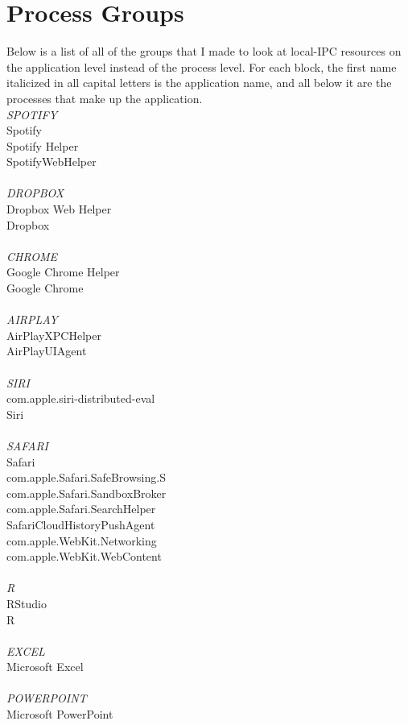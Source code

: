 \chapter{Process Groups}
\label{appendix:processGroups}
Below is a list of all of the groups that I made to look at local-IPC resources on the application level instead of the process level.  For each block, the first name italicized in all capital letters is the application name, and all below it are the processes that make up the application.
\\
\textit{SPOTIFY}\\
Spotify\\
Spotify Helper\\
SpotifyWebHelper\\
\\
\textit{DROPBOX}\\
Dropbox Web Helper\\
Dropbox\\
\\
\textit{CHROME}\\
Google Chrome Helper\\
Google Chrome\\
\\
\textit{AIRPLAY}\\
AirPlayXPCHelper\\
AirPlayUIAgent\\
\\
\textit{SIRI}\\
com.apple.siri-distributed-eval\\
Siri\\
\\
\textit{SAFARI}\\
Safari\\
com.apple.Safari.SafeBrowsing.S\\
com.apple.Safari.SandboxBroker\\
com.apple.Safari.SearchHelper\\
SafariCloudHistoryPushAgent\\
com.apple.WebKit.Networking\\
com.apple.WebKit.WebContent\\
\\
\textit{R}\\
RStudio\\
R\\
\\
\textit{EXCEL}\\
Microsoft Excel\\
\\
\textit{POWERPOINT}\\
Microsoft PowerPoint\\

